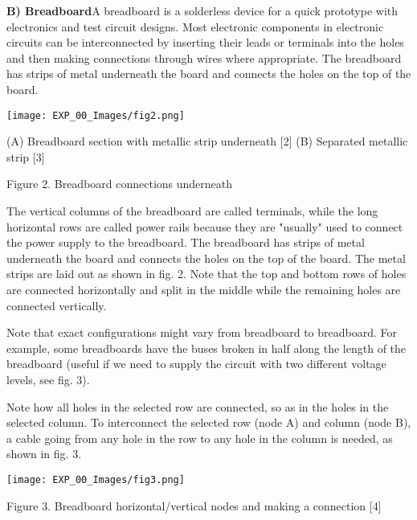 \documentclass[12pt,a4paper]{article}
\begin{document}
\begin{justify}
\noindent \textbf{B) Breadboard}A breadboard is a solderless device for a quick prototype with electronics and test circuit designs. Most electronic components in electronic circuits can be interconnected by inserting their leads or terminals into the holes and then making connections through wires where appropriate. The breadboard has strips of metal underneath the board and connects the holes on the top of the board.


\begin{center} 
\texttt{[image: EXP\_00\_Images/fig2.png]}
\end{center}
\vspace{-10mm}
\begin{center} {(A) Breadboard section with metallic strip underneath [2]   (B)  Separated metallic strip [3]}\end{center}
\vspace{-10mm}
\begin{center} {Figure 2. Breadboard connections underneath}\end{center}


\noindent The vertical columns of the breadboard are called terminals, while the long horizontal rows are called power rails because they are "usually" used to connect the power supply to the breadboard. The breadboard has strips of metal underneath the board and connects the holes on the top of the board. The metal strips are laid out as shown in fig. 2. Note that the top and bottom rows of holes are connected horizontally and split in the middle while the remaining holes are connected vertically.\par
\noindent Note that exact configurations might vary from breadboard to breadboard. For example, some breadboards have the buses broken in half along the length of the breadboard (useful if we need to supply the circuit with two different voltage levels, see fig. 3).\par
\noindent Note how all holes in the selected row are connected, so as in the holes in the selected column. To interconnect the selected row (node A) and column (node B), a cable going from any hole in the row to any hole in the column is needed, as shown in fig. 3.\par
\vspace{-7mm}
\begin{center} 
\texttt{[image: EXP\_00\_Images/fig3.png]}
\end{center}
\vspace{-8mm}
\begin{center} {Figure 3. Breadboard horizontal/vertical nodes and making a connection [4]}\end{center}


\end{justify}
\end{document}
